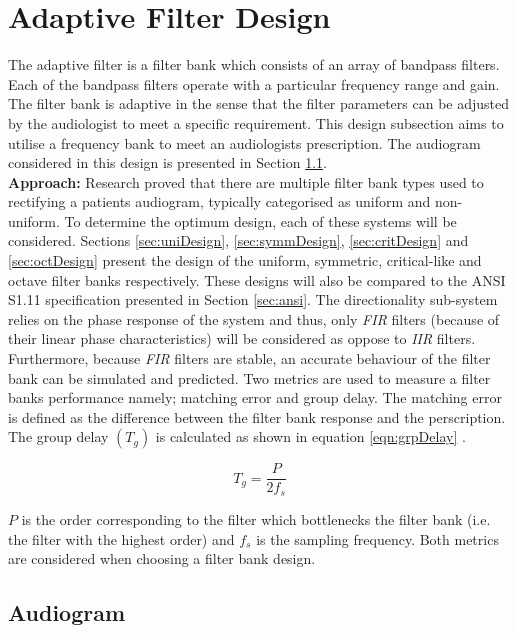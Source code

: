 \documentclass[11pt,onecolumn]{witseiepaper}
\begin{document}
\section{Adaptive Filter Design}

\noindent The adaptive filter is a filter bank which consists of an array of bandpass filters. Each of the bandpass filters operate with a particular frequency range and gain. The filter bank is adaptive in the sense that the filter parameters can be adjusted by the audiologist to meet a specific requirement. This design subsection aims to utilise a frequency bank to meet an audiologists prescription.  The audiogram considered in this design is presented in Section \ref{sec:audiogram}.\\

\noindent \textbf{Approach:} Research proved that there are multiple filter bank types used to rectifying a patients audiogram, typically categorised as uniform and non-uniform. To determine the optimum design, each of these systems will be considered. Sections \ref{sec:uniDesign}, \ref{sec:symmDesign}, \ref{sec:critDesign} and \ref{sec:octDesign} present the design of the uniform, symmetric, critical-like and octave filter banks respectively. These designs will also be compared to the ANSI S1.11 specification presented in Section \ref{sec:ansi}. The directionality sub-system relies on the phase response of the system and thus, only \textit{FIR} filters (because of their linear phase characteristics) will be considered as oppose to \textit{IIR} filters. Furthermore, because \textit{FIR} filters are stable, an accurate behaviour of the filter bank can be simulated and predicted. Two metrics are used to measure a filter banks performance namely; matching error and group delay. The matching error is defined as the difference between the filter bank response and the perscription. The group delay $(T_g)$ is calculated as shown in equation \ref{eqn:grpDelay} \cite{chang}.

\begin{equation}
\label{eqn:grpDelay}
T_g = \frac{P}{2f_s}
\end{equation}

\noindent $P$ is the order corresponding to the filter which bottlenecks the filter bank (i.e. the filter with the highest order) and $f_s$ is the sampling frequency. Both metrics are considered when choosing a filter bank design.

\subsection{Audiogram}
\label{sec:audiogram}
\end{document}
